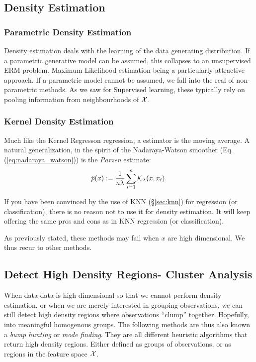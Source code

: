 \subsection{Density Estimation}
\label{sec:density_estimation}

\subsubsection{Parametric Density Estimation}
Density estimation deals with the learning of the data generating distribution.
If a parametric generative model can be assumed, this collapses to an unsupervised ERM problem. 
Maximum Likelihood estimation being a particularly attractive approach.
If a parametric model cannot be assumed, we fall into the real of non-parametric methods. As we saw for Supervised learning, these typically rely on pooling information from neighbourhoods of $\mathcal{X}$.

\subsubsection{Kernel Density Estimation}

Much like the Kernel Regresson regression, a \naive estimator is the moving average.
A natural generalization, in the spirit of the Nadaraya-Watson smoother (Eq.(\ref{eq:nadaraya_watson})) is the \emph{Parzen} estimate:
\begin{align}
\label{eq:parzen}
	\hat{p}(x):=\frac{1}{n \lambda} \sum_{i=1}^n \mathcal{K}_\lambda(x,x_i).
\end{align}

\begin{remark}
If you have been convinced by the use of KNN (\S\ref{sec:knn}) for regression (or classification), there is no reason not to use it for density estimation. It will keep offering the same pros and cons as in KNN regression (or classification).
\end{remark}

As previously stated, these methods may fail when $x$ are high dimensional. We thus recur to other methods.


\subsection{Detect High Density Regions- Cluster Analysis}
When data data is high dimensional so that we cannot perform density estimation, or when we are merely interested in grouping observations, we can still detect high density regions where observations ``clump'' together. Hopefully, into meaningful homogenous groups.
The following methods are thus also known a \emph{bump hunting} or \emph{mode finding}.
They are all different heuristic algorithms that return high density regions. Either defined as groups of observations, or as regions in the feature space $\mathcal{X}$.

